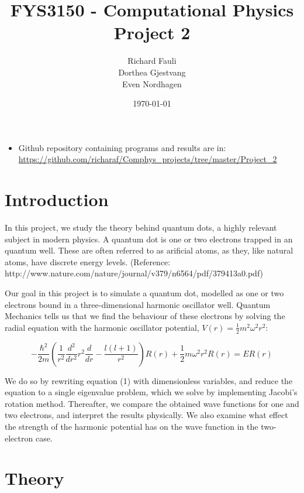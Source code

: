 \documentclass[norsk,a4paper,12pt]{article}
\title{FYS3150 - Computational Physics\\\vspace{2mm} \Large{Project 2}}
\author{\large Richard Fauli\\ Dorthea Gjestvang\\ Even Nordhagen}
\date{\today}
\begin{document}
\maketitle

\begin{abstract}
\end{abstract}
\begin{itemize}
\item Github repository containing programs and results are in: \url{https://github.com/richaraf/Comphys_projects/tree/master/Project_2}
\end{itemize}
\section{Introduction}
In this project, we study the theory behind quantum dots, a highly relevant subject in modern physics. A quantum dot is one or two electrons trapped in an quantum well. These are often referred to as arificial atoms, as they, like natural atoms, have discrete energy levels. (Reference: http://www.nature.com/nature/journal/v379/n6564/pdf/379413a0.pdf)\par
\vspace{3mm}

Our goal in this project is to simulate a quantum dot, modelled as one or two electrons bound in a three-dimensional harmonic oscillator well. Quantum Mechanics tells us that we find the behaviour of these electrons by solving the radial equation with the harmonic oscillator potential, $V(r) = \frac{1}{2}m^2\omega^2r^2$:

\begin{equation}
    - \frac{\hbar^2}{2m}(\frac{1}{r^2}\frac{d^2}{dr^2}r^2\frac{d}{dr} - \frac{l(l+1)}{r^2})R(r) + \frac{1}{2}m\omega^2r^2R(r) = ER(r)
\end{equation}
\vspace{3mm}

We do so by rewriting equation (1) with dimensionless variables, and reduce the equation to a single eigenvalue problem, which we solve by implementing Jacobi's rotation method. Thereafter, we compare the obtained wave functions for one and two electrons, and interpret the results physically. We also examine what effect the strength of the harmonic potential has on the wave function in the two-electron case.

\section{Theory}
\end{document}
